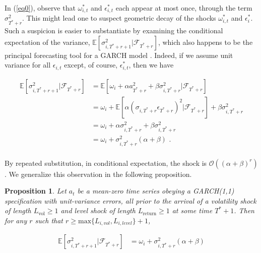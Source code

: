 \documentclass[11pt,3p,review,authoryear]{elsarticle}
\newtheorem{prop}{Proposition}
\theoremstyle{definition}
\begin{document}
In (\ref{eq0}), observe that $\omega_{i,t}^{*}$ and $\epsilon^{*}_{i,t}$ each appear at most once, through the term $\sigma^{2}_{T^{*}+r}$.  This might lead one to suspect  geometric decay of the shocks $\omega_{i,t}^{*}$ and $\epsilon^{*}_{i}$.  Such a suspicion is easier to substantiate by examining the conditional expectation of the variance, $\mathbb{E}[ \sigma^{2}_{i,T^{*}+r+1} |\mathcal{F}_{T^{*}+r}]$, which also happens to be the principal forecasting tool for a GARCH model \citep{zivot2009practical}.  Indeed, if we assume unit variance for all $\epsilon_{i,t}$ except, of course, $\epsilon^{*}_{i,t}$, then we have

\begin{align*}
\mathbb{E}[ \sigma^{2}_{i,T^{*}+r+1} |\mathcal{F}_{T^{*}+r}] & = \mathbb{E}[\omega_{i} + \alpha a_{T^{*}+r}^{2} + \beta\sigma^{2}_{i,T^{*}+r} |\mathcal{F}_{T^{*}+r}] \\
& = \omega_{i} + \mathbb{E}[\alpha(\sigma_{i,T^{*}+r}\epsilon_{T^{*}+r})^{2} |\mathcal{F}_{T^{*}+r}] + \beta\sigma^{2}_{i,T^{*}+r} \\
& = \omega_{i} + \alpha\sigma_{i,T^{*}+r}^{2} + \beta\sigma^{2}_{i,T^{*}+r} \tag{Due to the unit variance assumption}\\
& = \omega_{i} + \sigma^{2}_{i,T^{*}+r}(\alpha + \beta) \text{ .} \\
\end{align*}

By repeated substitution, in conditional expectation, the shock is $\mathcal{O}((\alpha+\beta)^{r})$.  We generalize this observation in the following proposition.

\begin{prop}
Let $a_{t}$ be a mean-zero time series obeying a GARCH(1,1) specification with unit-variance errors, all prior to the arrival of a volatility shock of length $L_{\text{vol}} \geq 1$ and level shock of length $L_{\text{return}}\geq 1$ at some time $T^{*}+1$.  Then for any $r$ such that $r \geq \text{max}\{L_{i, vol},L_{i, level}\} + 1$, 

\begin{align*}
\mathbb{E}[ \sigma^{2}_{i,T^{*}+r+1} |\mathcal{F}_{T^{*}+r}] & = \omega_{i} + \sigma^{2}_{i,T^{*}+r}(\alpha + \beta)
\end{align*}
\end{prop}
\end{document}
